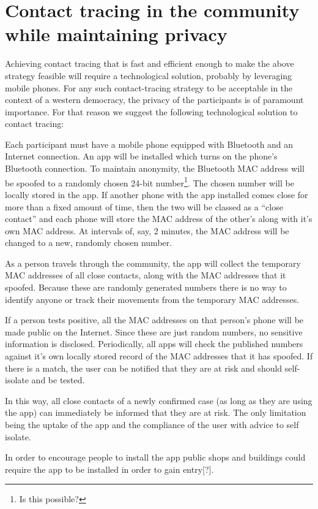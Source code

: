 \documentclass{article}
\begin{document}
\section{Contact tracing in the community while maintaining privacy}

Achieving contact tracing that is fast and efficient enough to make the above strategy feasible will require a technological solution, probably by leveraging mobile phones. For any such contact-tracing strategy to be acceptable in the context of a western democracy, the privacy of the participants is of paramount importance. For that reason we suggest the following technological solution to contact tracing:

Each participant must have a mobile phone equipped with Bluetooth and an Internet connection. An app will be installed which turns on the phone's Bluetooth connection. To maintain anonymity, the Bluetooth MAC address will be spoofed to a randomly chosen 24-bit number\footnote{Is this possible?}. The chosen number will be locally stored in the app. If another phone with the app installed comes close for more than a fixed amount of time, then the two will be classed as a ``close contact'' and each phone will store the MAC address of the other's along with it's own MAC address. At intervals of, say, 2 minutes, the MAC address will be changed to a new, randomly chosen number.

As a person travels through the community, the app will collect the temporary MAC addresses of all close contacts, along with the MAC addresses that it spoofed. Because these are randomly generated numbers there is no way to identify anyone or track their movements from the temporary MAC addresses.

If a person tests positive, all the MAC addresses on that person's phone will be made public on the Internet. Since these are just random numbers, no sensitive information is disclosed. Periodically, all apps will check the published numbers against it's own locally stored record of the MAC addresses that it has spoofed. If there is a match, the user can be notified that they are at risk and should self-isolate and be tested.

In this way, all close contacts of a newly confirmed case (as long as they are using the app) can immediately be informed that they are at risk. The only limitation being the uptake of the app and the compliance of the user with advice to self isolate.

In order to encourage people to install the app public shops and buildings could require the app to be installed in order to gain entry[?].
\end{document}

